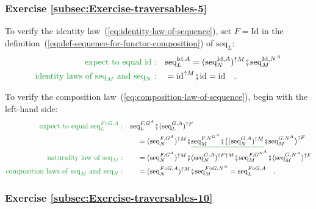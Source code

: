 \subsubsection*{Exercise \ref{subsec:Exercise-traversables-5}}

To verify the identity law~(\ref{eq:identity-law-of-sequence}),
set $F=\text{Id}$ in the definition~(\ref{eq:def-sequence-for-functor-composition})
of $\text{seq}_{L}$:
\begin{align*}
{\color{greenunder}\text{expect to equal }\text{id}:}\quad & \text{seq}_{L}^{\text{Id},A}=(\text{seq}_{N}^{\text{Id},A})^{\uparrow M}\bef\text{seq}_{M}^{\text{Id},N^{A}}\\
{\color{greenunder}\text{identity laws of }\text{seq}_{M}\text{ and }\text{seq}_{N}:}\quad & =\text{id}^{\uparrow M}\bef\text{id}=\text{id}\quad.
\end{align*}

To verify the composition law~(\ref{eq:composition-law-of-sequence}),
begin with the left-hand side:
\begin{align*}
{\color{greenunder}\text{expect to equal }\text{seq}_{L}^{F\circ G,A}:}\quad & \text{seq}_{L}^{F,G^{A}}\bef(\text{seq}_{L}^{G,A})^{\uparrow F}\\
 & \quad=(\text{seq}_{N}^{F,G^{A}})^{\uparrow M}\bef\gunderline{\text{seq}_{M}^{F,N^{G^{A}}}\bef\big((\text{seq}_{N}^{G,A})^{\uparrow M}}\bef\text{seq}_{M}^{G,N^{A}}\big)^{\uparrow F}\\
{\color{greenunder}\text{naturality law of }\text{seq}_{M}:}\quad & \quad=(\text{seq}_{N}^{F,G^{A}})^{\uparrow M}\bef(\text{seq}_{N}^{G,A})^{\uparrow F\uparrow M}\bef\text{seq}_{M}^{F,G^{N^{A}}}\bef(\text{seq}_{M}^{G,N^{A}})^{\uparrow F}\\
{\color{greenunder}\text{composition laws of }\text{seq}_{M}\text{ and }\text{seq}_{N}:}\quad & \quad=(\text{seq}_{N}^{F\circ G,A})^{\uparrow M}\bef\text{seq}_{M}^{F\circ G,N^{A}}=\text{seq}_{L}^{F\circ G,A}\quad.
\end{align*}


\subsubsection*{Exercise \ref{subsec:Exercise-traversables-10}}

